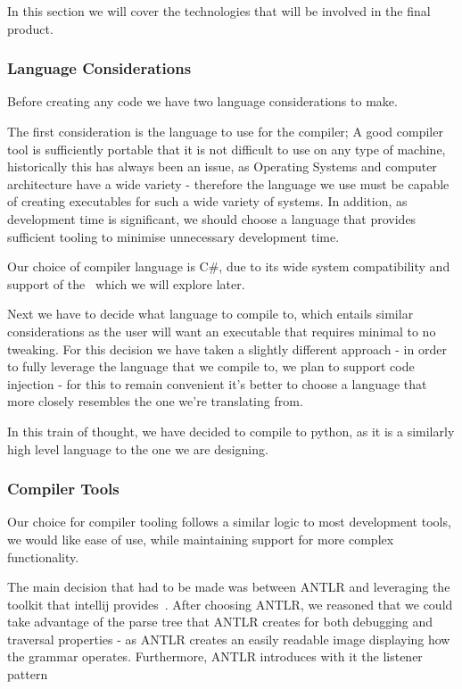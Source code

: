 In this section we will cover the technologies that will be involved in the final product.

\subsubsection{Language Considerations}
Before creating any code we have two language considerations to make.

The first consideration is the language to use for the compiler;
A good compiler tool is sufficiently portable that it is not difficult to use on any type of machine, historically this
has always been an issue, as Operating Systems and computer architecture have a wide variety - therefore the language
we use must be capable of creating executables for such a wide variety of systems.
In addition, as development time is significant, we should choose a language that provides sufficient tooling to
minimise unnecessary development time.

Our choice of compiler language is C#, due to its wide system compatibility and support of the~\cite{ANTLR} which we
will explore later.

Next we have to decide what language to compile to, which entails similar considerations as the user will want an
executable that requires minimal to no tweaking.
For this decision we have taken a slightly different approach - in order to fully leverage the language that we compile
to, we plan to support code injection - for this to remain convenient it's better to choose a language that more closely
resembles the one we're translating from.

In this train of thought, we have decided to compile to python, as it is a similarly high level language to the one
we are designing.

\subsubsection{Compiler Tools}\label{subsubsec:compilertools}
Our choice for compiler tooling follows a similar logic to most development tools, we would like ease of use, while
maintaining support for more complex functionality.

The main decision that had to be made was between ANTLR and leveraging the toolkit that intellij
provides~\cite{IntellijLanguage}.
After choosing ANTLR, we reasoned that we could take advantage of the parse tree that ANTLR creates for both debugging
and traversal properties - as ANTLR creates an easily readable image displaying how the grammar operates.
Furthermore, ANTLR introduces with it the listener pattern~\cite[p18]{ANTLRReference}

